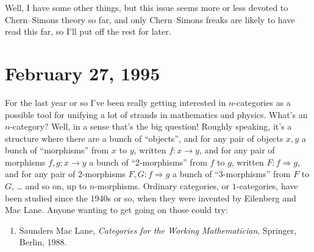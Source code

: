 \documentclass[12pt]{article}
\def\tightlist{}
\begin{document}
Well, I have some other things, but this issue seems more or less
devoted to Chern--Simons theory so far, and only Chern--Simons freaks are
likely to have read this far, so I'll put off the rest for later.



\hypertarget{week49}{%
\section{February 27, 1995}\label{week49}}

For the last year or so I've been really getting interested in
\(n\)-categories as a possible tool for unifying a lot of strands in
mathematics and physics. What's an \(n\)-category? Well, in a sense
that's the big question! Roughly speaking, it's a structure where there
are a bunch of ``objects'', and for any pair of objects \(x,y\) a bunch
of ``morphisms'' from \(x\) to \(y\), written \(f\colon x \to y\), and
for any pair of morphisms \(f, g\colon x \to y\) a bunch of
``2-morphisms'' from \(f\) to \(g\), written
\(F\colon f \Rightarrow g\), and for any pair of \(2\)-morphisms
\(F, G\colon f \Rightarrow g\) a bunch of ``3-morphisms'' from \(F\) to
\(G\), \ldots{} and so on, up to \(n\)-morphisms. Ordinary categories,
or \(1\)-categories, have been studied since the 1940s or so, when they
were invented by Eilenberg and Mac Lane. Anyone wanting to get going on
those could try:

\begin{enumerate}
\def\labelenumi{\arabic{enumi})}
\tightlist
\item
  Saunders Mac Lane, \emph{Categories for the Working Mathematician},
  Springer, Berlin, 1988.
\end{enumerate}
\end{document}
